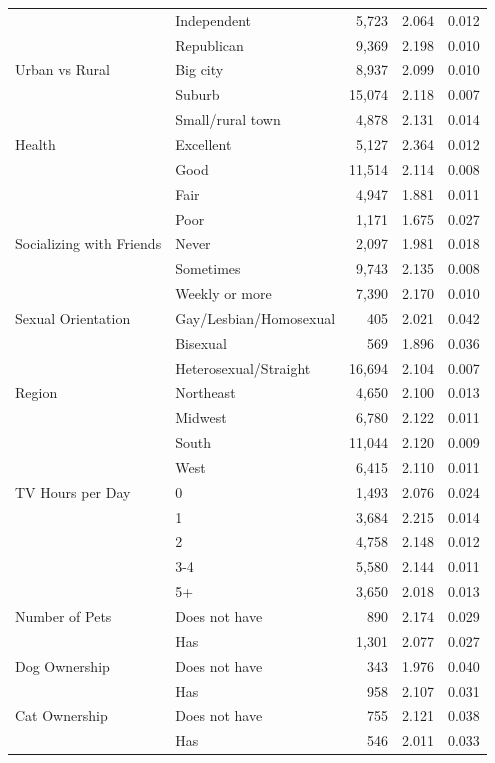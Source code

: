 \begin{table}[htbp]
\begin{tabular}{llrrr}
 & Independent & 5,723 & 2.064 & 0.012 \\
 & Republican & 9,369 & 2.198 & 0.010 \\
\midrule
Urban vs Rural & Big city & 8,937 & 2.099 & 0.010 \\
 & Suburb & 15,074 & 2.118 & 0.007 \\
 & Small/rural town & 4,878 & 2.131 & 0.014 \\
\midrule
Health & Excellent & 5,127 & 2.364 & 0.012 \\
 & Good & 11,514 & 2.114 & 0.008 \\
 & Fair & 4,947 & 1.881 & 0.011 \\
 & Poor & 1,171 & 1.675 & 0.027 \\
\midrule
Socializing with Friends & Never & 2,097 & 1.981 & 0.018 \\
 & Sometimes & 9,743 & 2.135 & 0.008 \\
 & Weekly or more & 7,390 & 2.170 & 0.010 \\
\midrule
Sexual Orientation & Gay/Lesbian/Homosexual & 405 & 2.021 & 0.042 \\
 & Bisexual & 569 & 1.896 & 0.036 \\
 & Heterosexual/Straight & 16,694 & 2.104 & 0.007 \\
\midrule
Region & Northeast & 4,650 & 2.100 & 0.013 \\
 & Midwest & 6,780 & 2.122 & 0.011 \\
 & South & 11,044 & 2.120 & 0.009 \\
 & West & 6,415 & 2.110 & 0.011 \\
\midrule
TV Hours per Day & 0 & 1,493 & 2.076 & 0.024 \\
 & 1 & 3,684 & 2.215 & 0.014 \\
 & 2 & 4,758 & 2.148 & 0.012 \\
 & 3-4 & 5,580 & 2.144 & 0.011 \\
 & 5+ & 3,650 & 2.018 & 0.013 \\
\midrule
Number of Pets & Does not have & 890 & 2.174 & 0.029 \\
 & Has & 1,301 & 2.077 & 0.027 \\
\midrule
Dog Ownership & Does not have & 343 & 1.976 & 0.040 \\
 & Has & 958 & 2.107 & 0.031 \\
\midrule
Cat Ownership & Does not have & 755 & 2.121 & 0.038 \\
 & Has & 546 & 2.011 & 0.033 \\
\bottomrule
\end{tabular}
\end{table}
